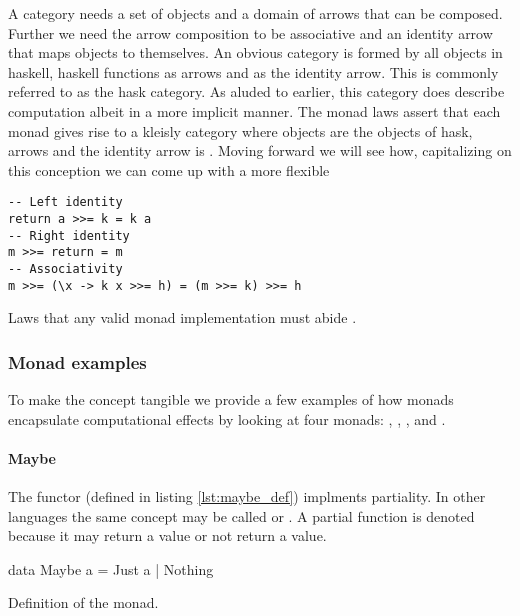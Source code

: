   A category needs a set of objects and a domain of arrows that can be
  composed. Further we need the arrow composition to be associative
  and an identity arrow that maps objects to themselves. An obvious
  category is formed by all objects in haskell, haskell functions as
  arrows and  as the identity arrow. This is
  commonly referred to as the hask category. As aluded to earlier,
  this category does describe computation albeit in a more implicit
  manner. The monad laws assert that each monad gives rise to a
  kleisly category where objects are the objects of hask, arrows
   and the identity arrow is .
  Moving forward we will see how, capitalizing on this conception we
  can come up with a more flexible

\begin{code}
\begin{verbatim}
-- Left identity
return a >>= k = k a
-- Right identity
m >>= return = m
-- Associativity
m >>= (\x -> k x >>= h) = (m >>= k) >>= h
\end{verbatim}
    \caption{\label{lst:monad_laws}Laws that any valid monad
      implementation must abide \cite{yorgeyTypeclassopedia2009}.}
  \end{code}


  \subsubsection{Monad examples}

  To make the concept tangible we provide a few examples of how monads
  encapsulate computational effects by looking at four monads: ,
   , , and .

  \paragraph{Maybe}

  The  functor (defined in listing \ref{lst:maybe_def})
  implments partiality. In other languages the same concept may be
  called  or . A partial function is denoted
   because it may return a value or not return a
  value.

  \begin{code}
\begin{haskellcode}
data Maybe a = Just a | Nothing
\end{haskellcode}
    \caption{\label{lst:maybe_def}Definition of the  monad.}
  \end{code}

